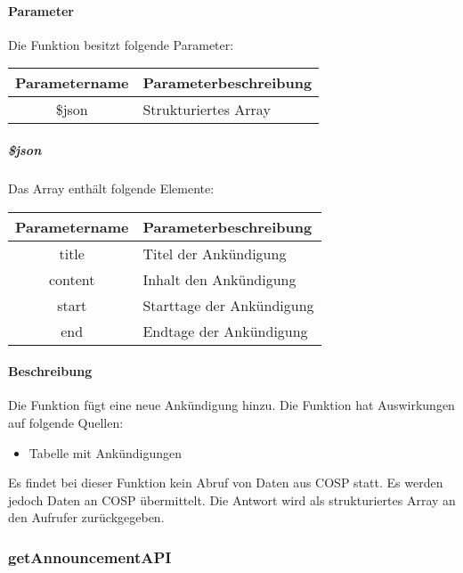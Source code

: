 \paragraph{Parameter} Die Funktion besitzt folgende Parameter:
\begin{table}[H]
	\begin{tabular}{|c|p{11cm}|}
		\hline
		\textbf{Parametername} & \textbf{Parameterbeschreibung} \\ \hline
		\$json & Strukturiertes Array \\ \hline
	\end{tabular}
\end{table}
\subparagraph{\$json}Das Array enthält folgende Elemente:
\begin{table}[H]
	\begin{tabular}{|c|p{11cm}|}
		\hline
		\textbf{Parametername} & \textbf{Parameterbeschreibung} \\ \hline
		title   & Titel der Ankündigung \\ \hline
		content & Inhalt den Ankündigung \\ \hline
		start   & Starttage der Ankündigung \\ \hline
		end     & Endtage der Ankündigung \\ \hline
	\end{tabular}
\end{table}
\paragraph{Beschreibung} Die Funktion fügt eine neue Ankündigung hinzu. Die Funktion hat Auswirkungen auf folgende Quellen:
\begin{itemize}
	\item Tabelle mit Ankündigungen
\end{itemize}
Es findet bei dieser Funktion kein Abruf von Daten aus {\glqq COSP\grqq} statt. Es werden jedoch Daten an {\glqq COSP\grqq} übermittelt. Die Antwort wird als strukturiertes Array an den Aufrufer zurückgegeben.
\subsubsection{getAnnouncementAPI}
